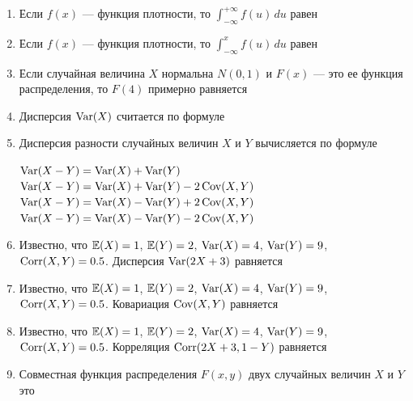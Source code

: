 \documentclass[12pt, a4paper]{article}\usepackage[]{graphicx}\usepackage[]{color}
\begin{document}
\begin{enumerate}

					\item Если $f(x)$ — функция плотности, то $\int_{-\infty}^{+\infty}f(u)\,du$ равен


					\item Если $f(x)$ — функция плотности, то $\int_{-\infty}^{x}f(u)\,du$ равен


					\item Если случайная величина $X$ нормальна $N(0,1)$ и $F(x)$ — это ее функция распределения, то $F(4)$ примерно равняется


					\newpage


					\item Дисперсия $\operatorname{Var}(X)$ считается по формуле


					\item Дисперсия разности случайных величин $X$ и $Y$ вычисляется по формуле

					{$\operatorname{Var}(X-Y)=\operatorname{Var}(X)+\operatorname{Var}(Y)$}
					{$\operatorname{Var}(X-Y)=\operatorname{Var}(X)+\operatorname{Var}(Y)-2\operatorname{Cov}(X,Y)$}
					{$\operatorname{Var}(X-Y)=\operatorname{Var}(X)-\operatorname{Var}(Y)+2\operatorname{Cov}(X,Y)$}
					{$\operatorname{Var}(X-Y)=\operatorname{Var}(X)-\operatorname{Var}(Y)-2\operatorname{Cov}(X,Y)$}

					\item Известно, что $\mathbb{E}(X)=1$, $\mathbb{E}(Y)=2$, $\operatorname{Var}(X)=4$, $\operatorname{Var}(Y)=9$, $\operatorname{Corr}(X,Y)=0.5$. Дисперсия $\operatorname{Var}(2X+3)$  равняется



					\item Известно, что $\mathbb{E}(X)=1$, $\mathbb{E}(Y)=2$, $\operatorname{Var}(X)=4$, $\operatorname{Var}(Y)=9$, $\operatorname{Corr}(X,Y)=0.5$. Ковариация $\operatorname{Cov}(X,Y)$  равняется



					\item Известно, что $\mathbb{E}(X)=1$, $\mathbb{E}(Y)=2$, $\operatorname{Var}(X)=4$, $\operatorname{Var}(Y)=9$, $\operatorname{Corr}(X,Y)=0.5$. Корреляция $\operatorname{Corr}(2X+3,1-Y)$  равняется


					\item Совместная функция распределения $F(x,y)$ двух случайных величин $X$ и $Y$ это


\end{enumerate}
\end{document}
